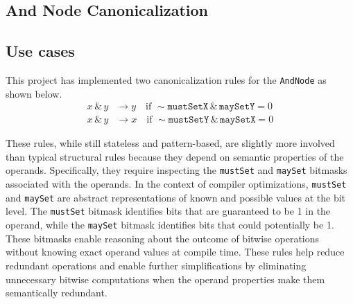 \subsection{And Node Canonicalization}
\subsection*{Use cases}
This project has implemented two canonicalization rules for the \texttt{AndNode} as shown below.
\begin{align*}
    x \,\&\, y &\rightarrow y \quad \text{if } \sim \texttt{mustSetX} \,\&\, \texttt{maySetY} = 0 \\
    x \,\&\, y &\rightarrow x \quad \text{if } \sim \texttt{mustSetY} \,\&\, \texttt{maySetX} = 0
\end{align*}

These rules, while still stateless and pattern-based, are slightly more involved than typical structural rules because they depend on semantic properties of the operands. Specifically, they require inspecting the \texttt{mustSet} and \texttt{maySet} bitmasks associated with the operands. In the context of compiler optimizations, \texttt{mustSet} and \texttt{maySet} are abstract representations of known and possible values at the bit level. The \texttt{mustSet} bitmask identifies bits that are guaranteed to be 1 in the operand, while the \texttt{maySet} bitmask identifies bits that could potentially be 1. These bitmasks enable reasoning about the outcome of bitwise operations without knowing exact operand values at compile time.
These rules help reduce redundant operations and enable further simplifications by eliminating unnecessary bitwise computations when the operand properties make them semantically redundant.

